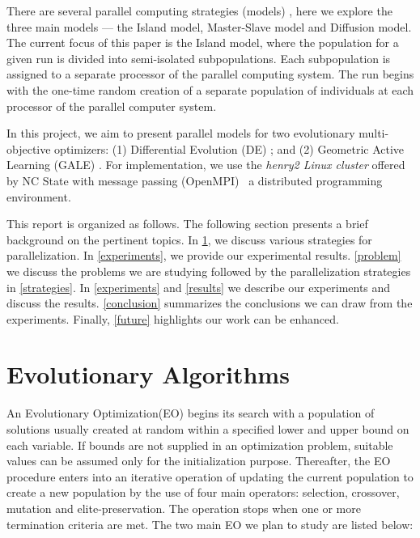 \documentclass[conference]{IEEEtran}
\begin{document}
	There are several parallel computing strategies (models) \cite{08parallel}, here we explore the three main models --- the Island model, Master-Slave model and Diffusion model. The current focus of this paper is the Island model, where the population for a given run is divided into semi-isolated subpopulations. Each subpopulation is assigned to a separate processor of the parallel computing system. The run begins with the one-time random creation of a separate population of individuals at each processor of the parallel computer system.
	
	In this project, we aim to present parallel models for two evolutionary multi-objective optimizers: (1) Differential Evolution (DE) \cite{storn97}; and (2) Geometric Active Learning (GALE) \cite{krall15}. For implementation, we use the \textit{henry2 Linux cluster} offered by NC State with message passing (OpenMPI)~\cite{openMPI04} a distributed programming environment.
	
	This report is organized as follows. The following section presents a brief background on the pertinent topics. In \textsection\ref{algos}, we discuss various strategies for parallelization. In \textsection\ref{experiments}, we provide our experimental results. \textsection\ref{problem} we discuss the problems we are studying followed by the parallelization strategies in \textsection\ref{strategies}. In \textsection\ref{experiments} and \textsection\ref{results} we describe our experiments and discuss the results. \textsection\ref{conclusion} summarizes the conclusions we can draw from the experiments. Finally, \textsection\ref{future} highlights our work can be enhanced.
	
	\section{Evolutionary Algorithms}
	\label{algos}
	An Evolutionary Optimization(EO) begins its search with a population of solutions usually created at random within a specified lower and upper bound on each variable. If bounds are not supplied in an optimization problem, suitable values can be assumed only for the initialization purpose. Thereafter, the EO procedure enters into an iterative operation of updating the current population to create a new population by the use of four main operators: selection, crossover, mutation and elite-preservation. The operation stops when one or more termination criteria are met. The two main EO we plan to study are listed below:
	
\end{document}
